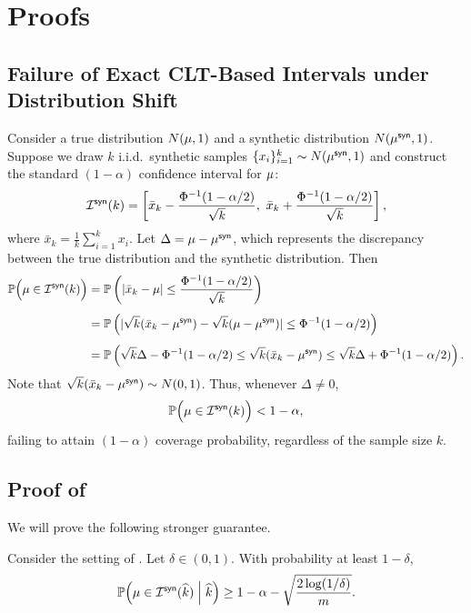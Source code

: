\section{Proofs}

\subsection{Failure of Exact CLT-Based Intervals under Distribution Shift}\label{sec-impossibility-exact-CLT}

Consider a true distribution $N(\mu,1)$ and a synthetic distribution $N(\mu^{\mathsf{syn}},1)$. Suppose we draw $k$ i.i.d.~synthetic samples $\{ x_i \}_{i=1}^k \sim N(\mu^{\mathsf{syn}},1)$ and construct the standard $(1-\alpha)$ confidence interval for $\mu$:
\[
\mathcal{I}^{\mathsf{syn}}(k) = \left[ \bar{x}_k - \frac{\Phi^{-1}(1-\alpha/2)}{\sqrt{k}}, ~ \bar{x}_k + \frac{\Phi^{-1}(1-\alpha/2)}{\sqrt{k}} \right],
\]
where $\bar{x}_k = \frac{1}{k} \sum_{i=1}^k x_i$. Let $\Delta = \mu - \mu^{\mathsf{syn}}$, which represents the discrepancy between the true distribution and the synthetic distribution. Then
\begin{align*}
\mathbb{P}\Big( \mu \in \mathcal{I}^{\mathsf{syn}}(k) \Big)
&=
\mathbb{P}\left( | \bar{x}_k - \mu | \le \frac{\Phi^{-1}(1-\alpha/2)}{\sqrt{k}} \right) \\[4pt]
&=
\mathbb{P}\left( | \sqrt{k} (\bar{x}_k - \mu^{\mathsf{syn}}) - \sqrt{k} (\mu - \mu^{\mathsf{syn}}) | \le \Phi^{-1}(1-\alpha/2) \right) \\[4pt]
&=
\mathbb{P}\left( \sqrt{k} \Delta - \Phi^{-1}(1-\alpha/2) \le \sqrt{k} (\bar{x}_k - \mu^{\mathsf{syn}}) \le \sqrt{k} \Delta + \Phi^{-1}(1-\alpha/2) \right).
\end{align*}
Note that $\sqrt{k} (\bar{x}_k - \mu^{\mathsf{syn}}) \sim N(0,1)$. Thus, whenever $\Delta\neq 0$,
\[
\mathbb{P}\Big( \mu \in \mathcal{I}^{\mathsf{syn}}(k) \Big) < 1-\alpha,
\]
failing to attain $(1-\alpha)$ coverage probability, regardless of the sample size $k$.


\subsection{Proof of }\label{sec-thm-coverage-1D-proof}

We will prove the following stronger guarantee.

\begin{lemma}\label{lem-conditional-coverage-1D}
Consider the setting of . Let $\delta\in(0,1)$. With probability at least $1-\delta$,
\begin{equation}\label{eqn-conditional-coverage-1D}
\mathbb{P}\Big( \mu \in \mathcal{I}^{\mathsf{syn}}(\widehat{k}) \Bigm| \widehat{k} \Big) \ge 1 - \alpha - \sqrt{\frac{2\log(1/\delta)}{m}}.
\end{equation}
\end{lemma}


